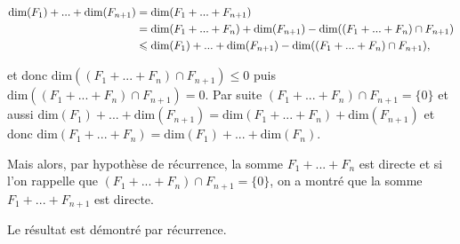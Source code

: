 {{\begin{align*}\ensuremath
\text{dim}(F_1)+...+\text{dim}(F_{n+1})&=\text{dim}(F_1+...+F_{n+1})\\ 
 &=\text{dim}(F_1+...+F_n) +\text{dim}(F_{n+1})-\text{dim}((F_1+...+F_n)\cap F_{n+1})\\
 &\leqslant\text{dim}(F_1)+...+\text{dim}(F_{n+1})-\text{dim}((F_1+...+F_n)\cap F_{n+1}),
\end{align*}

 
et donc $\text{dim}((F_1+...+F_n)\cap F_{n+1})\leqslant0$ puis $\text{dim}((F_1+...+F_n)\cap F_{n+1})= 0$. Par suite $(F_1+...+F_n)\cap F_{n+1}=\{0\}$ et aussi $\text{dim}(F_1)+...+\text{dim}(F_{n+1})=\text{dim}(F_1+...+F_n) +\text{dim}(F_{n+1})$ et donc $\text{dim}(F_1+...+F_n)=\text{dim}(F_1)+ ... +\text{dim}(F_n)$.

Mais alors, par hypothèse de récurrence, la somme $F_1+...+F_n$ est directe et si l'on rappelle que 
$(F_1+...+F_n)\cap F_{n+1}=\{0\}$, on a montré que la somme $F_1+...+F_{n+1}$ est directe.

Le résultat est démontré par récurrence.
}
}
